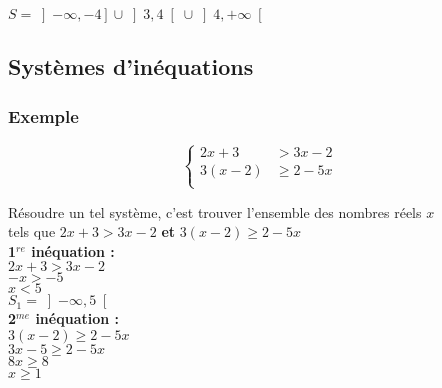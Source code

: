 $S=\left]-\infty,-4\right]\cup\left]3,4\right[\cup\left]4,+\infty\right[$

\newpage 
\subsection{Systèmes d'inéquations}

\subsubsection{Exemple }

\vspace*{.5cm}

\begin{minipage}{3cm}
\begin{equation*}
\left\lbrace \begin{aligned}
2x+3      &> 3x-2\\
3(x-2)    &\geqslant 2-5x\\
\end{aligned}
\right.
\end{equation*}
\end{minipage}

\vspace*{.5cm}

Résoudre un tel système, c'est trouver l'ensemble des nombres réels $x$ \\
tels que $ 2x + 3 > 3x - 2 $ 
\textbf{et} $ 3\left(x-2\right) \geqslant 2 -5x $\\

\textbf{1$^{re}$ inéquation :}\\

$2x + 3 > 3x - 2$\\

$- x > -5$\\

$x < 5$ \\

$ S_1 = \left]-\infty, 5 \right[ $ \\

\textbf{2$^{me}$ inéquation :}\\

$ 3\left(x-2\right) \geqslant 2 - 5x $\\

$ 3x - 5 \geqslant 2 - 5x $\\

$ 8 x \geqslant 8 $\\

$ x \geqslant 1 $ \\

